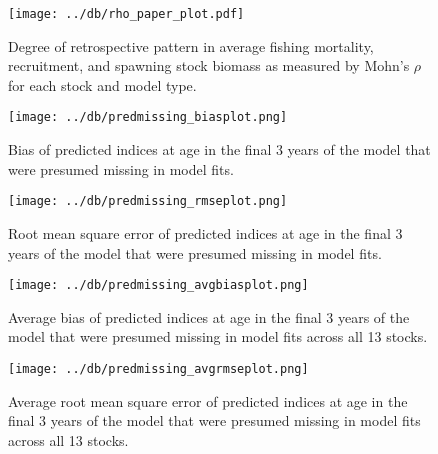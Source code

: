 \documentclass[12pt,letterpaper, leqno]{article}
\begin{document}
\begin{landscape}


\begin{figure}
\caption{Degree of retrospective pattern in average fishing mortality, recruitment, and spawning stock biomass as measured by Mohn's $\rho$ for each stock and model type.}\label{rho_paper_plot}
\begin{center}
\texttt{[image: ../db/rho\_paper\_plot.pdf]}
\end{center}
\end{figure}


\begin{figure}
\caption{Bias of predicted indices at age in the final 3 years of the model that were presumed missing in model fits.}\label{predmissing_biasplot}
\begin{center}
\texttt{[image: ../db/predmissing\_biasplot.png]}
\end{center}
\end{figure}

\begin{figure}
\caption{Root mean square error of predicted indices at age in the final 3 years of the model that were presumed missing in model fits.}\label{predmissing_rmseplot}
\begin{center}
\texttt{[image: ../db/predmissing\_rmseplot.png]}
\end{center}
\end{figure}

\begin{figure}
\caption{Average bias of predicted indices at age in the final 3 years of the model that were presumed missing in model fits across all 13 stocks.}\label{predmissing_avgbiasplot}
\begin{center}
\texttt{[image: ../db/predmissing\_avgbiasplot.png]}
\end{center}
\end{figure}


\begin{figure}
\caption{Average root mean square error of predicted indices at age in the final 3 years of the model that were presumed missing in model fits across all 13 stocks.}\label{predmissing_avgrmseplot}
\begin{center}
\texttt{[image: ../db/predmissing\_avgrmseplot.png]}
\end{center}
\end{figure}


\end{landscape}
\end{document}
